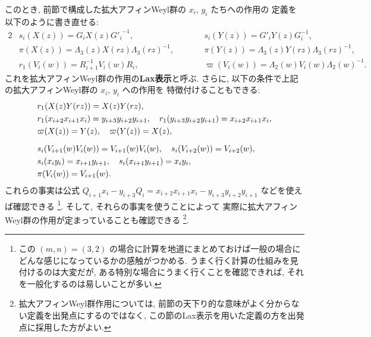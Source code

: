 \documentclass[12pt,twoside,dvipdfm]{msjproc}
\theoremstyle{definition} %
\theoremstyle{definition} %
\theoremstyle{definition} %
\numberwithin{theorem}{section}
\numberwithin{equation}{section}
\numberwithin{figure}{section}
\numberwithin{table}{section}
\begin{document}
このとき, 前節で構成した拡大アフィンWeyl群の $x_i$, $y_i$ たちへの作用の
定義を以下のように書き直せる:
\begin{alignat*}{2}
 &
 s_i(X(z)) = G_i X(z) {G'_i}^{-1}, \qquad
 & & 
 s_i(Y(z)) = G'_i Y(z) G_i^{-1},
 \\ &
 \pi(X(z)) = \Lambda_3(z) X(rz) \Lambda_3(rz)^{-1}, \qquad
 & &
 \pi(Y(z)) = \Lambda_3(z) Y(rz) \Lambda_3(rz)^{-1},
 \\ &
 r_1(V_i(w)) = R_{i+1}^{-1} V_i(w) R_i,  \qquad
 & & 
 \varpi(V_i(w)) = \Lambda_2(w) V_i(w) \Lambda_2(w)^{-1}.
\end{alignat*}
これを拡大アフィンWeyl群の作用の{\bf Lax表示}と呼ぶ.
さらに, 以下の条件で上記の拡大アフィンWeyl群の $x_i$, $y_i$ への作用を
特徴付けることもできる:
\begin{align*}
 &
 r_1(X(z)Y(rz)) = X(z)Y(rz), 
 \\ &
 r_1(x_{i+2}x_{i+1}x_i) = y_{i+3}y_{i+2}y_{i+1}, \quad
 r_1(y_{i+3}y_{i+2}y_{i+1}) = x_{i+2}x_{i+1}x_i,
 \\ &
 \varpi(X(z)) = Y(z), \quad
 \varpi(Y(z)) = X(z),
 \\[\medskipamount] &
 s_i(V_{i+1}(w)V_i(w)) = V_{i+1}(w)V_i(w), \quad
 s_i(V_{i+2}(w))=V_{i+2}(w),
 \\ &
 s_i(x_i y_i) = x_{i+1}y_{i+1}, \quad 
 s_i(x_{i+1}y_{i+1})= x_i y_i,
 \\ &
 \pi(V_i(w)) = V_{i+1}(w).
\end{align*}
これらの事実は公式 \(
 Q_{i+1}x_i - y_{i+3}Q_i = x_{i+2}x_{i+1}x_i - y_{i+3}y_{i+2}y_{i+1}
\) などを使えば確認できる%
\footnote{この $(m,n)=(3,2)$ の場合に計算を地道にまとめておけば一般の場合に
どんな感じになっているかの感触がつかめる. 
うまく行く計算の仕組みを見付けるのは大変だが, 
ある特別な場合にうまく行くことを確認できれば, それを一般化するのは易しいことが多い.}.
そして, それらの事実を使うことによって
実際に拡大アフィンWeyl群の作用が定まっていることも確認できる%
\footnote{拡大アフィンWeyl群作用については, 
前節の天下り的な意味がよく分からない定義を出発点にするのではなく, 
この節のLax表示を用いた定義の方を出発点に採用した方がよい.}.
\end{document}
